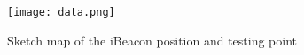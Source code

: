 \begin{figure}[!h]
\centering
\texttt{[image: data.png]}
\caption{Sketch map of the iBeacon position and testing point}
\label{fig:universe}
\end{figure}